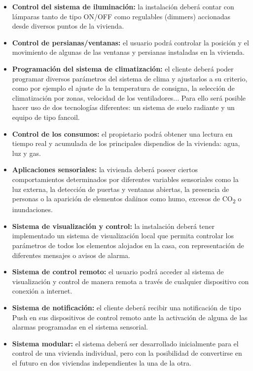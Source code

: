 \begin{itemize}
\item \textbf{Control del sistema de iluminación:} la instalación deberá contar con lámparas tanto de tipo ON/OFF como regulables (dimmers) accionadas desde diversos puntos de la vivienda.
\item \textbf{Control de persianas/ventanas:} el usuario podrá controlar la posición y el movimiento de algunas de las ventanas y persianas instaladas en la vivienda.
\item \textbf{Programación del sistema de climatización: }el cliente deberá poder programar diversos parámetros del sistema de clima y ajustarlos a su criterio, como por ejemplo el ajuste de la temperatura de consigna, la selección de climatización por zonas, velocidad de los ventiladores... Para ello será posible hacer uso de dos tecnologías diferentes: un sistema de suelo radiante y un equipo de tipo fancoil.
\item \textbf{Control de los consumos: }el propietario podrá obtener una lectura en tiempo real y acumulada de los principales dispendios de la vivienda: agua, luz y gas.
\item \textbf{Aplicaciones sensoriales: }la vivienda deberá poseer ciertos comportamientos determinados por diferentes variables sensoriales como la luz externa, la detección de puertas y ventanas abiertas, la presencia de personas o la aparición de elementos dañinos como humo, excesos de CO\textsubscript{2} o inundaciones.
\item \textbf{Sistema de visualización y control: }la instalación deberá tener implementado un sistema de visualización local que permita controlar los parámetros de todos los elementos alojados en la casa, con representación de diferentes mensajes o avisos de alarma.
\item \textbf{Sistema de control remoto: }el usuario podrá acceder al sistema de visualización y control de manera remota a través de cualquier dispositivo con conexión a internet.
\item \textbf{Sistema de notificación: }el cliente deberá recibir una notificación de tipo Push en sus dispositivos de control remoto ante la activación de alguna de las alarmas programadas en el sistema sensorial.
\item \textbf{Sistema modular: }el sistema deberá ser desarrollado inicialmente para el control de una vivienda individual, pero con la posibilidad de convertirse en el futuro en dos viviendas independientes la una de la otra.
\end{itemize}
